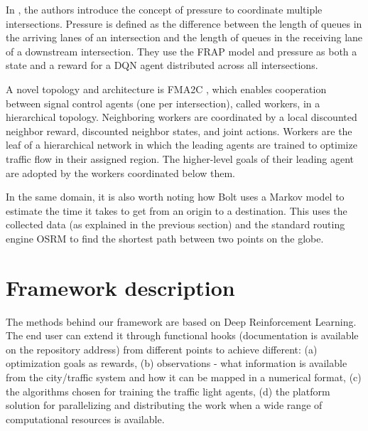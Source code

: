 \documentclass[a4paper,twoside]{article}
\begin{document}
In \cite{MPLight}, the authors introduce the concept of pressure to coordinate multiple intersections. Pressure is defined as the difference between the length of queues in the arriving lanes of an intersection and the length of queues in the receiving lane of a downstream intersection. They use the FRAP \cite{zheng2019learning} model and pressure as both a state and a reward for a DQN agent distributed across all intersections.

A novel topology and architecture is FMA2C \cite{chu2019multiagent}, which enables cooperation between signal control agents (one per intersection), called workers, in a hierarchical topology. Neighboring workers are coordinated by a local discounted neighbor reward, discounted neighbor states, and joint actions. Workers are the leaf of a hierarchical network in which the leading agents are trained to optimize traffic flow in their assigned region. The higher-level goals of their leading agent are adopted by the workers coordinated below them.

In the same domain, it is also worth noting how Bolt \cite{BOLT} uses a Markov model to estimate the time it takes to get from an origin to a destination. This uses the collected data (as explained in the previous section) and the standard routing engine OSRM \cite{OSRM} to find the shortest path between two points on the globe.

\section{Framework description} \label{sec:frameworkdesc}

The methods behind our framework are based on Deep Reinforcement Learning. The end user can extend it through functional hooks (documentation is available on the repository address) from different points to achieve different: (a) optimization goals as rewards, (b) observations - what information is available from the city/traffic system and how it can be mapped in a numerical format, (c) the algorithms chosen for training the traffic light agents, (d) the platform solution for parallelizing and distributing the work when a wide range of computational resources is available.
\end{document}
